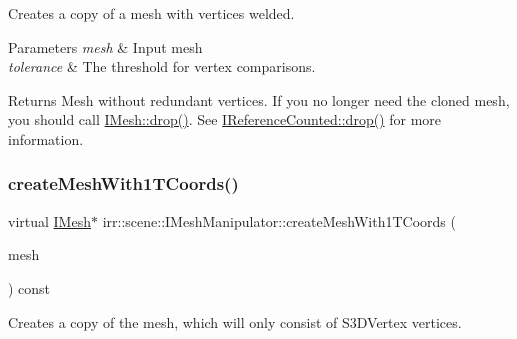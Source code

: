 Creates a copy of a mesh with vertices welded. 


\begin{DoxyParams}{Parameters}
{\em mesh} & Input mesh \\
\hline
{\em tolerance} & The threshold for vertex comparisons. \\
\hline
\end{DoxyParams}
\begin{DoxyReturn}{Returns}
Mesh without redundant vertices. If you no longer need the cloned mesh, you should call \hyperlink{classirr_1_1IReferenceCounted_a03856a09355b89d178090c4a5f738543}{I\+Mesh\+::drop()}. See \hyperlink{classirr_1_1IReferenceCounted_a03856a09355b89d178090c4a5f738543}{I\+Reference\+Counted\+::drop()} for more information. 
\end{DoxyReturn}
\mbox{\label{classirr_1_1scene_1_1IMeshManipulator_af7feb558fbaad9671667d1332c83bb5d}} 
\subsubsection{\texorpdfstring{create\+Mesh\+With1\+T\+Coords()}{createMeshWith1TCoords()}}
{\footnotesize\ttfamily virtual \hyperlink{classirr_1_1scene_1_1IMesh}{I\+Mesh}$\ast$ irr\+::scene\+::\+I\+Mesh\+Manipulator\+::create\+Mesh\+With1\+T\+Coords (\begin{DoxyParamCaption}\item[{\hyperlink{classirr_1_1scene_1_1IMesh}{I\+Mesh} $\ast$}]{mesh }\end{DoxyParamCaption}) const\hspace{0.3cm}{\ttfamily [pure virtual]}}



Creates a copy of the mesh, which will only consist of S3\+D\+Vertex vertices. 


